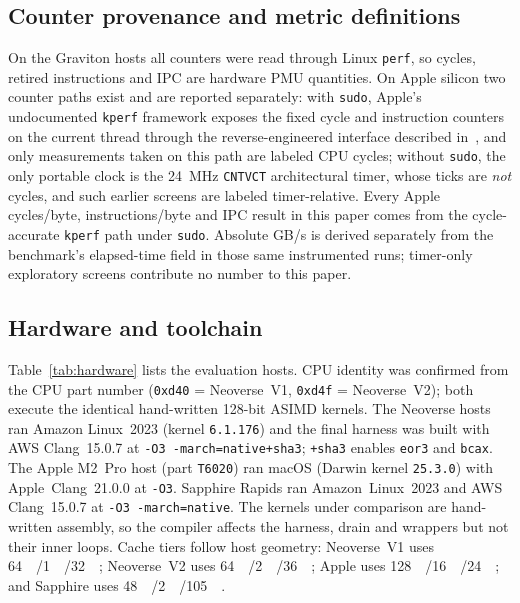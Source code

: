 \documentclass[fleqn,10pt]{wlscirep}
\begin{document}
\subsection*{Counter provenance and metric definitions}
On the Graviton hosts all counters were read through Linux \texttt{perf}, so cycles, retired instructions and IPC are hardware PMU quantities. On Apple silicon two counter paths exist and are reported separately: with \texttt{sudo}, Apple's undocumented \texttt{kperf} framework exposes the fixed cycle and instruction counters on the current thread through the reverse-engineered interface described in~\cite{kpcdemo}, and only measurements taken on this path are labeled CPU cycles; without \texttt{sudo}, the only portable clock is the \SI{24}{\mega\hertz} \texttt{CNTVCT} architectural timer, whose ticks are \emph{not} cycles, and such earlier screens are labeled timer-relative. Every Apple cycles/byte, instructions/byte and IPC result in this paper comes from the cycle-accurate \texttt{kperf} path under \texttt{sudo}. Absolute GB/s is derived separately from the benchmark's elapsed-time field in those same instrumented runs; timer-only exploratory screens contribute no number to this paper.

\subsection*{Hardware and toolchain}
Table~\ref{tab:hardware} lists the evaluation hosts. CPU identity was confirmed from the CPU part number (\texttt{0xd40} = Neoverse~V1, \texttt{0xd4f} = Neoverse~V2); both execute the identical hand-written 128-bit ASIMD kernels. The Neoverse hosts ran Amazon Linux~2023 (kernel \texttt{6.1.176}) and the final harness was built with AWS Clang~15.0.7 at \texttt{-O3 -march=native+sha3}; \texttt{+sha3} enables \texttt{eor3} and \texttt{bcax}. The Apple M2~Pro host (part \texttt{T6020}) ran macOS (Darwin kernel \texttt{25.3.0}) with Apple~Clang~21.0.0 at \texttt{-O3}. Sapphire Rapids ran Amazon~Linux~2023 and AWS Clang~15.0.7 at \texttt{-O3 -march=native}. The kernels under comparison are hand-written assembly, so the compiler affects the harness, drain and wrappers but not their inner loops. Cache tiers follow host geometry: Neoverse~V1 uses \SI{64}{\kibi\byte}/\SI{1}{\mebi\byte}/\SI{32}{\mebi\byte}; Neoverse~V2 uses \SI{64}{\kibi\byte}/\SI{2}{\mebi\byte}/\SI{36}{\mebi\byte}; Apple uses \SI{128}{\kibi\byte}/\SI{16}{\mebi\byte}/\SI{24}{\mebi\byte}; and Sapphire uses \SI{48}{\kibi\byte}/\SI{2}{\mebi\byte}/\SI{105}{\mebi\byte}.
\end{document}
